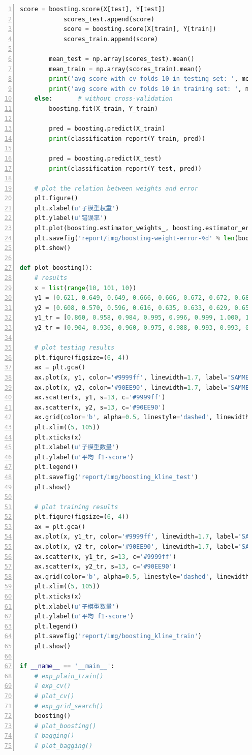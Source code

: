 \documentclass[12pt,a4paper]{article}
\theoremstyle{definition}
\begin{document}
\begin{appendix}
\begin{lstlisting}[language=Python,
	numbers=left,
	keywordstyle=\color{blue!70},
	frame=shadowbox,
	breaklines=True]
            score = boosting.score(X[test], Y[test])
            scores_test.append(score)
            score = boosting.score(X[train], Y[train])
            scores_train.append(score)

        mean_test = np.array(scores_test).mean()
        mean_train = np.array(scores_train).mean()
        print('avg score with cv folds 10 in testing set: ', mean_test)
        print('avg score with cv folds 10 in training set: ', mean_train)
    else:       # without cross-validation
        boosting.fit(X_train, Y_train)

        pred = boosting.predict(X_train)
        print(classification_report(Y_train, pred))

        pred = boosting.predict(X_test)
        print(classification_report(Y_test, pred))

    # plot the relation between weights and error
    plt.figure()
    plt.xlabel(u'子模型权重')
    plt.ylabel(u'错误率')
    plt.plot(boosting.estimator_weights_, boosting.estimator_errors_)
    plt.savefig('report/img/boosting-weight-error-%d' % len(boosting.estimator_weights_))
    plt.show()

def plot_boosting():
    # results
    x = list(range(10, 101, 10))
    y1 = [0.621, 0.649, 0.649, 0.666, 0.666, 0.672, 0.672, 0.688, 0.688, 0.710]
    y2 = [0.608, 0.570, 0.596, 0.616, 0.635, 0.633, 0.629, 0.650, 0.664, 0.668]
    y1_tr = [0.860, 0.958, 0.984, 0.995, 0.996, 0.999, 1.000, 1.000, 1.000, 1.000]
    y2_tr = [0.904, 0.936, 0.960, 0.975, 0.988, 0.993, 0.993, 0.995, 0.997, 0.998]

    # plot testing results
    plt.figure(figsize=(6, 4))
    ax = plt.gca()
    ax.plot(x, y1, color='#9999ff', linewidth=1.7, label='SAMME.R')
    ax.plot(x, y2, color='#90EE90', linewidth=1.7, label='SAMME')
    ax.scatter(x, y1, s=13, c='#9999ff')
    ax.scatter(x, y2, s=13, c='#90EE90')
    ax.grid(color='b', alpha=0.5, linestyle='dashed', linewidth=0.5)
    plt.xlim((5, 105))
    plt.xticks(x)
    plt.xlabel(u'子模型数量')
    plt.ylabel(u'平均 f1-score')
    plt.legend()
    plt.savefig('report/img/boosting_kline_test')
    plt.show()

    # plot training results
    plt.figure(figsize=(6, 4))
    ax = plt.gca()
    ax.plot(x, y1_tr, color='#9999ff', linewidth=1.7, label='SAMME.R')
    ax.plot(x, y2_tr, color='#90EE90', linewidth=1.7, label='SAMME')
    ax.scatter(x, y1_tr, s=13, c='#9999ff')
    ax.scatter(x, y2_tr, s=13, c='#90EE90')
    ax.grid(color='b', alpha=0.5, linestyle='dashed', linewidth=0.5)
    plt.xlim((5, 105))
    plt.xticks(x)
    plt.xlabel(u'子模型数量')
    plt.ylabel(u'平均 f1-score')
    plt.legend()
    plt.savefig('report/img/boosting_kline_train')
    plt.show()

if __name__ == '__main__':
    # exp_plain_train()
    # exp_cv()
    # plot_cv()
    # exp_grid_search()
    boosting()
    # plot_boosting()
    # bagging()
    # plot_bagging()
	\end{lstlisting}
	
\end{appendix}




\end{document}
